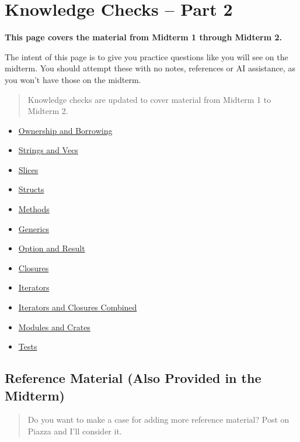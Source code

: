 \documentclass[
  11pt,
]{article}
\author{}
\date{}
\providecommand{\tightlist}{%
  \setlength{\itemsep}{0pt}\setlength{\parskip}{0pt}}
\begin{document}
\section{Knowledge Checks -- Part 2}\label{knowledge-checks-part-2}

\textbf{This page covers the material from Midterm 1 through Midterm 2.}

The intent of this page is to give you practice questions like you will
see on the midterm. You should attempt these with no notes, references
or AI assistance, as you won't have those on the midterm.

\begin{quote}
Knowledge checks are updated to cover material from Midterm 1 to Midterm
2.
\end{quote}

\begin{itemize}
\tightlist
\item
  \hyperref[ownership-and-borrowing]{Ownership and Borrowing}
\item
  \hyperref[strings-and-vecs]{Strings and Vecs}
\item
  \hyperref[slices]{Slices}
\item
  \hyperref[structs]{Structs}
\item
  \hyperref[methods]{Methods}
\item
  \hyperref[generics]{Generics}
\item
  \hyperref[option-and-result]{Option and Result}
\item
  \hyperref[closures]{Closures}
\item
  \hyperref[iterators]{Iterators}
\item
  \hyperref[iterators-and-closures-combined]{Iterators and Closures
  Combined}
\item
  \hyperref[modules-and-crates]{Modules and Crates}
\item
  \hyperref[tests]{Tests}
\end{itemize}

\subsection{Reference Material (Also Provided in the
Midterm)}\label{reference-material-also-provided-in-the-midterm}

\begin{quote}
Do you want to make a case for adding more reference material? Post on
Piazza and I'll consider it.
\end{quote}
\end{document}
